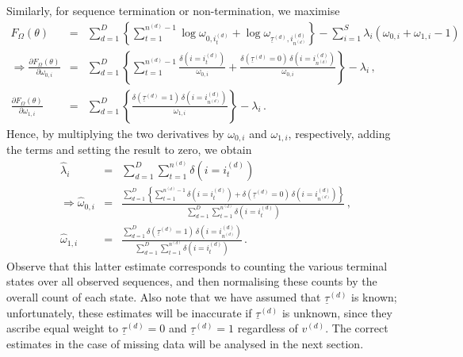 \documentclass[a4paper]{article}
\begin{document}
Similarly, for sequence termination or non-termination, we maximise
\begin{eqnarray}
  F_{\Omega}(\theta) & = & \sum_{d=1}^D \left\{\sum_{t=1}^{n^{(d)}-1}\log\omega_{0,i_{t}^{(d)}}+\log\omega_{\underline{\tau}^{(d)},i_{n^{(d)}}^{(d)}}\right\}
-\sum_{i=1}^{S}\lambda_i\left(\omega_{0,i}+\omega_{1,i}-1\right)
\label{eq:F:omega}
\\
\Rightarrow\frac{\partial F_{\Omega}(\theta)}{\partial\omega_{0,i}} & = &
\sum_{d=1}^D \left\{\sum_{t=1}^{n^{(d)}-1}\frac{\delta(i=i_{t}^{(d)})}{\omega_{0,i}}
   +\frac{\delta(\underline{\tau}^{(d)}\!=\!0)\,\delta(i=i_{n^{(d)}}^{(d)})}{\omega_{0,i}}\right\}
-\lambda_i\,,
\nonumber\\
\frac{\partial F_{\Omega}(\theta)}{\partial\omega_{1,i}} & = &
\sum_{d=1}^D \left\{\frac{\delta(\underline{\tau}^{(d)}\!=\!1)\,\delta(i=i_{n^{(d)}}^{(d)})}{\omega_{1,i}}\right\}
-\lambda_i\,.
\end{eqnarray}
Hence, by multiplying the two derivatives by $\omega_{0,i}$ and $\omega_{1,i}$, respectively, adding the terms and setting the result to zero, we obtain
\begin{eqnarray}
\hat{\lambda}_i & = & \sum_{d=1}^D \sum_{t=1}^{n^{(d)}}\delta(i=i_{t}^{(d)})
\nonumber\\
\Rightarrow \hat{\omega}_{0,i} & = & 
\frac{\sum_{d=1}^D \left\{\sum_{t=1}^{n^{(d)}-1}\delta(i=i_{t}^{(d)})
   +\delta(\underline{\tau}^{(d)}\!=\!0)\,\delta(i=i_{n^{(d)}}^{(d)})\right\}}
     {\sum_{d=1}^D \sum_{t=1}^{n^{(d)}}\delta(i=i_{t}^{(d)})}\,,
\nonumber\\
\hat{\omega}_{1,i} & = & \frac{\sum_{d=1}^D\delta(\underline{\tau}^{(d)}\!=\!1)\,\delta(i=i_{n^{(d)}}^{(d)})}
                                                  {\sum_{d=1}^D \sum_{t=1}^{n^{(d)}}\delta(i=i_{t}^{(d)})}\,.
\label{eq:F:omega:sol}
\end{eqnarray}
Observe that this latter estimate corresponds to counting the various terminal states over all observed sequences, and then normalising these counts by the overall count of each state.
Also note that we have assumed that $\underline{\tau}^{(d)}$ is known; unfortunately, these estimates will be inaccurate if $\underline{\tau}^{(d)}$ is unknown,
since they ascribe equal weight to $\underline{\tau}^{(d)}=0$ and $\underline{\tau}^{(d)}=1$ regardless of $v^{(d)}$.
The correct estimates in the case of missing data will be analysed in the next section.
\end{document}
